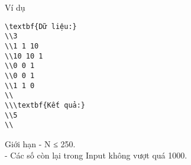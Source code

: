 Ví dụ
\begin{verbatim}
\textbf{Dữ liệu:}
\\3
\\1 1 10
\\10 10 1
\\0 0 1
\\0 0 1
\\1 1 0
\\
\\\textbf{Kết quả:}
\\5
\\\end{verbatim}
Giới hạn
- N ≤ 250.   
\\   - Các số còn lại trong Input không vượt quá 1000.